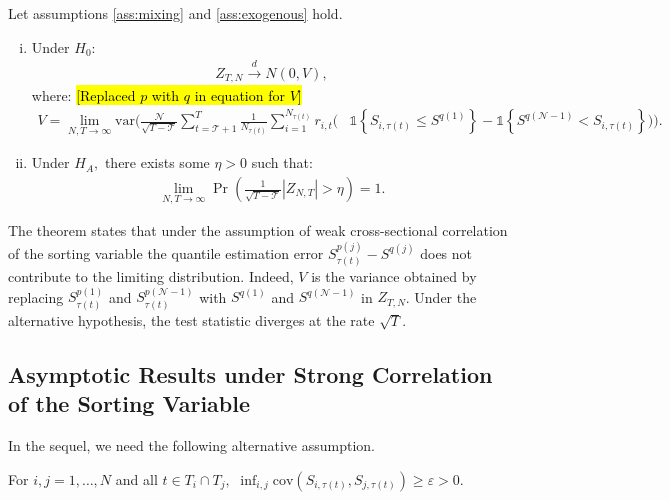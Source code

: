 \begin{theorem}
\label{th:observable} 

Let assumptions \ref{ass:mixing} and \ref{ass:exogenous} hold.

\begin{enumerate}[(i)]
\item Under $H_{0}$: \label{th:observable, i} 
\begin{align*}
    Z_{T,N}\overset{d}{\rightarrow }N(0,V), 
\end{align*}
where: \hl{[Replaced $p$ with $q$ in equation for $V$]}
\begin{align*}
    V = \lim_{N,T\rightarrow \infty } \mathrm{var} \Bigg( \frac{\mathcal{N}}{\sqrt{T-\mathcal{T}}}\sum_{t=\mathcal{T}+1}^{T}\frac{1}{N_{\tau(t)}} \sum_{i=1}^{N_{\tau(t)}} r_{i,t} \Big( &\mathds{1}\left\{ S_{i,\tau(t) } \leq S^{q(1)}\right\} - \mathds{1}\left\{ S^{q(\mathcal{N} -1)} < S_{i,\tau(t) }\right\} \Big) \Bigg).
\end{align*}

\item Under $H_{A},$ there exists some $\eta >0$ such that: \label{th:observable, ii} 
\begin{align*}
    \lim_{N,T\rightarrow \infty }\Pr \left( \frac{1}{\sqrt{T-\mathcal{T}}} \left\vert Z_{N,T} \right\vert>\eta \right) =1. 
\end{align*}
\end{enumerate}
\end{theorem}

\noindent
The theorem states that under the assumption of weak cross-sectional correlation of the sorting variable the quantile estimation error $S_{\tau(t)}^{p(j)}-S^{q(j)}$ does not contribute to the limiting distribution. Indeed, $V$ is the variance obtained by replacing $S_{\tau(t)}^{p(1)}$ and $S_{\tau(t)}^{p(\mathcal{N}-1)}$ with $S^{q(1)}$ and $S^{q(\mathcal{N}-1)}$ in $Z_{T,N}$. Under the alternative hypothesis, the test statistic diverges at the rate $\sqrt{T}$. 

\subsection{Asymptotic Results under Strong Correlation of the Sorting Variable}

In the sequel, we need the following alternative assumption. 

\begin{assumption}
\label{ass:strongdep} 

For $i,j=1, \ldots, N$ and all $t\in T_{i}\cap T_{j},$ $\inf_{i,j}\mathrm{cov}\left( S_{i,\tau(t)},S_{j,\tau(t)}\right) \geq \varepsilon >0$.
\end{assumption}

